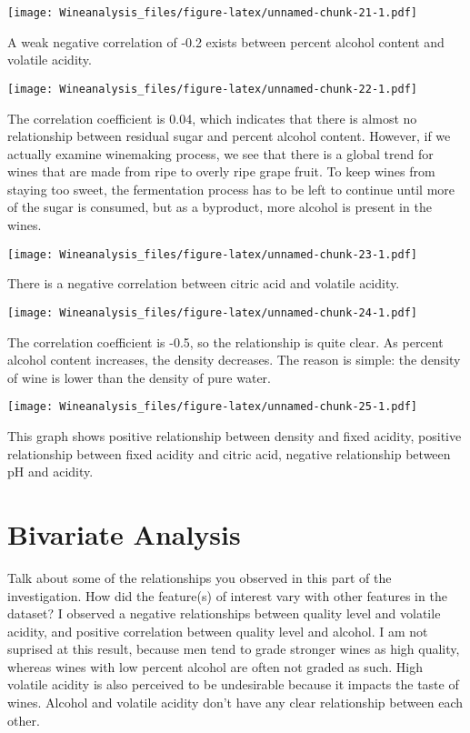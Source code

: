 \documentclass[]{article}
\begin{document}
\texttt{[image: Wineanalysis\_files/figure-latex/unnamed-chunk-21-1.pdf]}

A weak negative correlation of -0.2 exists between percent alcohol
content and volatile acidity.

\texttt{[image: Wineanalysis\_files/figure-latex/unnamed-chunk-22-1.pdf]}

The correlation coefficient is 0.04, which indicates that there is
almost no relationship between residual sugar and percent alcohol
content. However, if we actually examine winemaking process, we see that
there is a global trend for wines that are made from ripe to overly ripe
grape fruit. To keep wines from staying too sweet, the fermentation
process has to be left to continue until more of the sugar is consumed,
but as a byproduct, more alcohol is present in the wines.

\texttt{[image: Wineanalysis\_files/figure-latex/unnamed-chunk-23-1.pdf]}

There is a negative correlation between citric acid and volatile
acidity.

\texttt{[image: Wineanalysis\_files/figure-latex/unnamed-chunk-24-1.pdf]}

The correlation coefficient is -0.5, so the relationship is quite clear.
As percent alcohol content increases, the density decreases. The reason
is simple: the density of wine is lower than the density of pure water.

\texttt{[image: Wineanalysis\_files/figure-latex/unnamed-chunk-25-1.pdf]}

This graph shows positive relationship between density and fixed
acidity, positive relationship between fixed acidity and citric acid,
negative relationship between pH and acidity.

\section{Bivariate Analysis}\label{bivariate-analysis}

Talk about some of the relationships you observed in this part of the
investigation. How did the feature(s) of interest vary with other
features in the dataset? I observed a negative relationships between
quality level and volatile acidity, and positive correlation between
quality level and alcohol. I am not suprised at this result, because men
tend to grade stronger wines as high quality, whereas wines with low
percent alcohol are often not graded as such. High volatile acidity is
also perceived to be undesirable because it impacts the taste of wines.
Alcohol and volatile acidity don't have any clear relationship between
each other.
\end{document}
